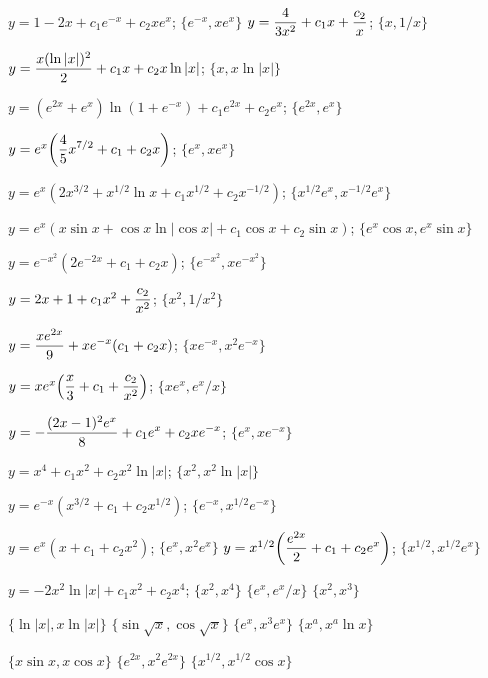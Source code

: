 \medskip

 $y=1-2x+c_{1}e^{-x}+c_{2}xe^{x}$;\;
$\{e^{-x},xe^{x}\}$
 $y=\displaystyle{\frac{4}{3x^{2}}+c_{1}x+\frac{c_{2}}{x}}$;\;
$\{x,1/x\}$

 $y=\displaystyle\frac{x(\ln|x|)^{2}}{2}+c_{1}x+c_{2}x\ln
|x|$;\;   $\{x,x\ln|x|\}$

  $y=(e^{2x}+e^{x})
\ln(1+e^{-x})+c_{1}e^{2x}+c_{2}e^{x}$;\;   $\{e^{2x},e^{x}\}$

$y=e^{x}\displaystyle{\left(\frac{4}{5}x^{7/2}+c_{1}+c_{2}x\right)}$;\;
$\{e^{x},xe^{x}\}$

$y=e^{x}(2x^{3/2}+x^{1/2}\ln x+c_{1}x^{1/2}+c_{2}x^{-1/2})$;\;
$\{x^{1/2}e^{x},x^{-1/2}e^{x}\}$

 $y=e^{x}(x\sin x+\cos x\ln|\cos x|+c_{1}\cos x+c_{2}\sin x)$;\;
$\{e^{x}\cos x,e^{x}\sin x\}$

 $y=e^{-x^{2}}(2e^{-2x}+c_{1}+c_{2}x)$;\;
$\{e^{-x^{2}},xe^{-x^{2}}\}$

 $y=2x+1+c_{1}x^{2}+\displaystyle\frac{c_{2}}{x^{2}}$;\;
$\{x^{2},1/x^{2}\}$

 $y=\displaystyle\frac{xe^{2x}}{9}+xe^{-x}(c_{1}+c_{2}x)$;\;
$\{xe^{-x},x^{2}e^{-x}\}$

$y=xe^{x}\displaystyle{\left(\frac{x}{3}+c_{1}+\frac{c_{2}}{x^{2}}\right)}$;\;
$\{xe^{x},e^{x}/x\}$

$y=-\displaystyle\frac{(2x-1)^{2}e^{x}}{8}+c_{1}e^{x}+c_{2}xe^{-x}$;\;
$\{e^{x},xe^{-x}\}$

$y=x^{4}+c_{1}x^{2}+c_{2}x^{2}\ln|x|$;\;    $\{x^{2},x^{2}\ln|x|\}$

 $y=e^{-x}(x^{3/2}+c_{1}+c_{2}x^{1/2})$; \;
$\{e^{-x},x^{1/2}e^{-x}\}$

 $y=e^{x}(x+c_{1}+c_{2}x^{2})$;\;   $\{e^{x},x^{2}e^{x}\}$
 $y=x^{1/2}\displaystyle{\left(\frac{e^{2x}}{2}+c_{1}+c_{2}e^{x}\right)}$;\;
$\{x^{1/2},x^{1/2}e^{x}\}$

$y=-2x^{2}\ln |x|+c_{1}x^{2}+c_{2}x^{4}$;\;   $\{x^{2},x^{4}\}$
 $\{e^{x},e^{x}/x\}$
 $\{x^{2},x^{3}\}$

 $\{\ln|x|,x\ln|x|\}$
 $\{\sin\sqrt{x},\cos\sqrt{x}\}$
 $\{e^{x},x^{3}e^{x}\}$
 $\{x^{a},x^{a}\ln x\}$

 $\{x\sin x,x\cos x\}$
 $\{e^{2x},x^{2}e^{2x}\}$
 $\{x^{1/2},x^{1/2}\cos x\}$

